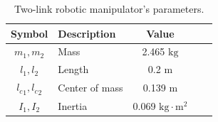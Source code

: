 \documentclass[journal]{IEEEtran}
\begin{document}
\begin{table}[t]
    \renewcommand{\arraystretch}{1.3}
    \caption{Two-link robotic manipulator's parameters.}
    \centering
    \begin{tabular}{c m{9.5em} c c c }
    \hline
    \textbf{Symbol} & \textbf{Description} & \textbf{Value} \\
    \hline
    \hline 
    $m_1,m_2$ & Mass & 2.465 $\mathrm{kg}$ \\
    \hline
    $l_1,l_2$  & Length & 0.2 $\mathrm{m}$ \\  
    \hline
    ${l_c}_1,{l_c}_2$ & Center of mass & 0.139 $\mathrm{m}$ \\
    \hline
    $I_1,I_2$  & Inertia & 0.069 $\mathrm{kg\cdot m^{2}}$ \\
    \hline
    \end{tabular}
    \label{table:system:params}
\end{table}
\end{document}
